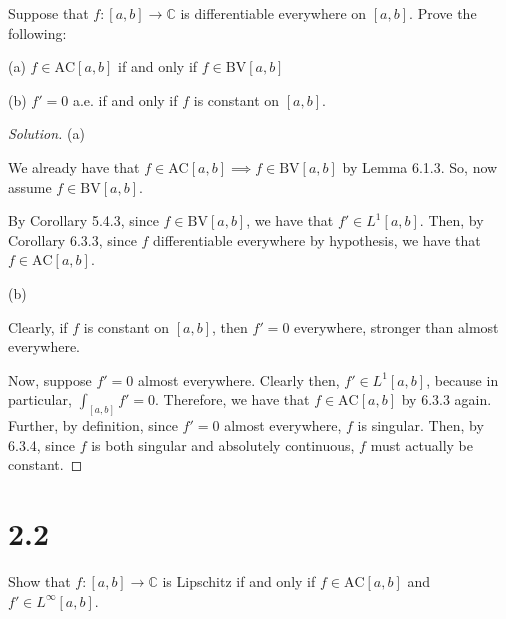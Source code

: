 \documentclass[10pt]{article}
\newcommand{\bv}{{\text{BV}}}
\newcommand{\ac}{{\text{AC}}}
\newenvironment{problem}[2][Problem]{\begin{trivlist}
\item[\hskip \labelsep {\bfseries #1}\hskip \labelsep {\bfseries #2.}]}{\end{trivlist}}
\begin{document}
\begin{problem}{6.3.10}

Suppose that $f: [a,b] \to \mathbb{C}$ is differentiable everywhere on $[a,b]$. Prove the following:

(a) $f \in \ac[a,b]$ if and only if $f \in \bv[a,b]$

(b) $f' = 0$ a.e. if and only if $f$ is constant on $[a,b]$.

\end{problem}
\begin{proof}[Solution]

(a)

We already have that $f \in \ac[a,b] \implies f \in \bv[a,b]$ by Lemma 6.1.3. So, now assume $f \in \bv[a,b]$.

By Corollary 5.4.3, since $f \in \bv[a,b]$, we have that $f' \in L^1[a,b]$. Then, by Corollary 6.3.3, since $f$ differentiable everywhere by hypothesis, we have that $f \in \ac[a,b]$.

(b)

Clearly, if $f$ is constant on $[a,b]$, then $f' = 0$ everywhere, stronger than almost everywhere.

Now, suppose $f' = 0$ almost everywhere. Clearly then, $f' \in L^1[a,b]$, because in particular, $\int_{[a,b]} f' = 0$. Therefore, we have that $f \in \ac[a,b]$ by 6.3.3 again. Further, by definition, since $f' = 0$ almost everywhere, $f$ is singular. Then, by 6.3.4, since $f$ is both singular and absolutely continuous, $f$ must actually be constant.

\end{proof}

\section*{2.2}

\begin{problem}{6.4.10}

Show that $f: [a,b] \to \mathbb{C}$ is Lipschitz if and only if $f \in \ac[a,b]$ and $f' \in L^\infty[a,b]$.

\end{problem}
\end{document}
